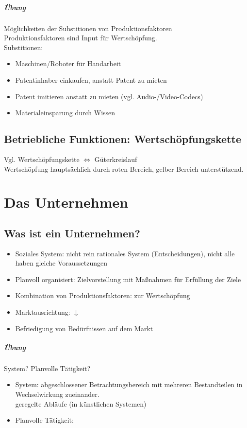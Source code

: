 \documentclass{scrreprt}
\begin{document}
\paragraph{Übung} Möglichkeiten der Substitionen von Produktionsfaktoren\\
Produktionsfaktoren sind Input für Wertschöpfung.\\
Substitionen: 
\begin{itemize}
\item Maschinen/Roboter für Handarbeit
\item Patentinhaber einkaufen, anstatt Patent zu mieten
\item Patent imitieren anstatt zu mieten (vgl. Audio-/Video-Codecs)
\item Materialeinsparung durch Wissen
\end{itemize}

\section{Betriebliche Funktionen: Wertschöpfungskette}
Vgl. Wertschöpfungskette $\Leftrightarrow$ Güterkreislauf\\
Wertschöpfung hauptsächlich durch roten Bereich, gelber Bereich unterstützend.

\chapter{Das Unternehmen}
\section{Was ist ein Unternehmen?}
\begin{itemize}
\item Soziales System: nicht rein rationales System (Entscheidungen), nicht alle haben gleiche Voraussetzungen
\item Planvoll organisiert: Zielvorstellung mit Maßnahmen für Erfüllung der Ziele
\item Kombination von Produktionsfaktoren: zur Wertschöpfung
\item Marktausrichtung: $\downarrow$
\item Befriedigung von Bedürfnissen auf dem Markt
\end{itemize}
\paragraph{Übung} System? Planvolle Tätigkeit?
\begin{itemize}
\item System: abgeschlossener Betrachtungsbereich mit mehreren Bestandteilen in Wechselwirkung zueinander.\\
geregelte Abläufe (in künstlichen Systemen)
\item Planvolle Tätigkeit: 
\end{itemize}
\end{document}
